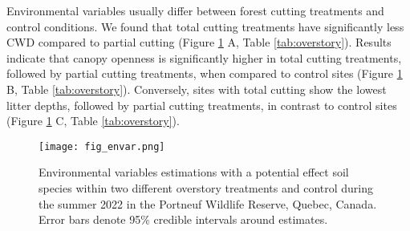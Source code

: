 Environmental variables usually differ between forest cutting treatments and control conditions. We found that total cutting treatments have significantly less CWD compared to partial cutting (Figure \ref{fig:envar} A, Table \ref{tab:overstory}). 
Results indicate that canopy openness is significantly higher in total cutting treatments, followed by partial cutting treatments, when compared to control sites (Figure \ref{fig:envar} B, Table \ref{tab:overstory}). 
Conversely, sites with total cutting show the lowest litter depths, followed by partial cutting treatments, in contrast to control sites (Figure \ref{fig:envar} C, Table \ref{tab:overstory}).

\vspace{0.5cm}

\begin{figure}[ht]
  \centering
  \texttt{[image: fig\_envar.png]}
  \caption[Environmental variables estimations with a potential effect soil species within two different overstory treatments and control.]
  {Environmental variables estimations with a potential effect soil species within two different overstory treatments and control 
  during the summer 2022 in the Portneuf Wildlife Reserve, Quebec, Canada. Error bars denote 95\% credible intervals around estimates.}
  \label{fig:envar}
\end{figure}

\vspace{0.5cm}

